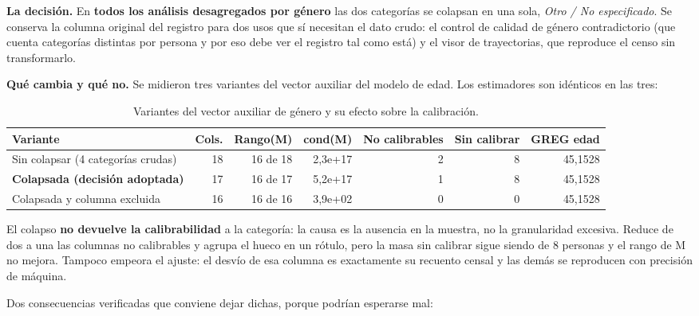 \textbf{La decisión.} En \textbf{todos los análisis desagregados por género} las
dos categorías se colapsan en una sola, \emph{Otro / No especificado}. Se conserva
la columna original del registro para dos usos que sí necesitan el dato crudo: el
control de calidad de género contradictorio (que cuenta categorías distintas por
persona y por eso debe ver el registro tal como está) y el visor de trayectorias,
que reproduce el censo sin transformarlo.

\textbf{Qué cambia y qué no.} Se midieron tres variantes del vector auxiliar del
modelo de edad. Los estimadores son idénticos en las tres:

\begin{table}[H]
  \centering
  \scriptsize
  \caption{Variantes del vector auxiliar de género y su efecto sobre la calibración.}
  \label{tab:mues-variantes-genero}
  \begin{tabular}{@{}p{4.6cm}rrrrrr@{}}
    \toprule
    \textbf{Variante} & \textbf{Cols.} & \textbf{Rango(M)} & \textbf{cond(M)}
      & \textbf{No calibrables} & \textbf{Sin calibrar} & \textbf{GREG edad} \\
    \midrule
    Sin colapsar (4 categorías crudas) & 18 & 16 de 18 & 2,3e+17 & 2 & 8 & 45,1528 \\
    \textbf{Colapsada (decisión adoptada)} & 17 & 16 de 17 & 5,2e+17 & 1 & 8 & 45,1528 \\
    Colapsada y columna excluida & 16 & 16 de 16 & 3,9e+02 & 0 & 0 & 45,1528 \\
    \bottomrule
  \end{tabular}
\end{table}

El colapso \textbf{no devuelve la calibrabilidad} a la categoría: la causa es la
ausencia en la muestra, no la granularidad excesiva. Reduce de dos a una las
columnas no calibrables y agrupa el hueco en un rótulo, pero la masa sin calibrar
sigue siendo de 8 personas y el rango de M no mejora. Tampoco empeora el ajuste:
el desvío de esa columna es exactamente su recuento censal y las demás se
reproducen con precisión de máquina.

Dos consecuencias verificadas que conviene dejar dichas, porque podrían esperarse
mal:

